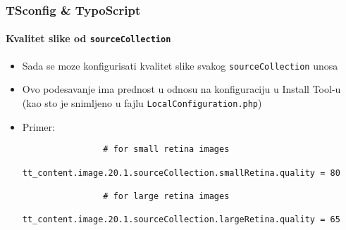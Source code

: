 \begin{frame}[fragile]
	\frametitle{TSconfig \& TypoScript}
	\framesubtitle{Kvalitet slike od \texttt{sourceCollection}}

	\lstset{basicstyle=\tiny\ttfamily}

	\begin{itemize}

		\item Sada se moze konfigurisati kvalitet slike svakog \texttt{sourceCollection} unosa 

		\item Ovo podesavanje ima prednost u odnosu na konfiguraciju u Install Tool-u\newline
			(kao sto je snimljeno u fajlu \texttt{LocalConfiguration.php})

		\item Primer:

			\begin{lstlisting}
				# for small retina images
				tt_content.image.20.1.sourceCollection.smallRetina.quality = 80

				# for large retina images
				tt_content.image.20.1.sourceCollection.largeRetina.quality = 65
			\end{lstlisting}

	\end{itemize}

\end{frame}



